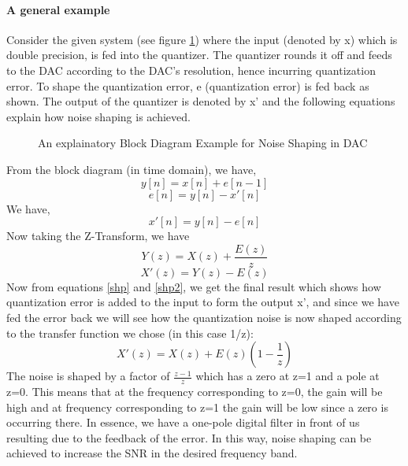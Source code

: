 \documentclass[colorlinks=true,pdfstartview=FitV,linkcolor=blue,
            citecolor=red,urlcolor=magenta]{ligodoc}
\begin{document}
    \paragraph{A general example}Consider the given system (see figure \ref{nshp}) where the input (denoted by x) which is double precision, is fed into the quantizer. The quantizer rounds it off and feeds to the DAC according to the DAC's resolution, hence incurring quantization error. To shape the quantization error, e (quantization error) is fed back as shown. The output of the quantizer is denoted by x' and the following equations explain how noise shaping is achieved.
	\begin{figure}[htbp]

  		\centering
  		
  		\caption{An explainatory Block Diagram Example for Noise Shaping in DAC}
		\label{nshp}
	\end{figure}
From the block diagram (in time domain), we have,
	\begin{equation}
		y[n]=x[n]+e[n-1]
	\end{equation}
	\begin{equation}
		e[n]=y[n]-x'[n]
	\end{equation}
We have,
	\begin{equation}
		x'[n]=y[n]-e[n]
	\end{equation}
Now taking the Z-Transform, we have
\begin{equation}
Y(z)=X(z)+\frac{E(z)}{z}
\label{shp}
\end{equation}
\begin{equation}
X'(z)=Y(z)-E(z)
\label{shp2}
\end{equation}
Now from equations \ref{shp} and \ref{shp2}, we get the final result which shows how quantization error is added to the input to form the output x', and since we have fed the error back we will see how the quantization noise is now shaped according to the transfer function we chose (in this case 1/z):
\begin{equation}
X'(z)=X(z)+E(z)(1-\frac{1}{z})
\end{equation}
The noise is shaped by a factor of $\frac{z-1}{z}$ which has a zero at z=1 and a pole at z=0. This means that at the frequency corresponding to z=0, the gain will be high and at frequency corresponding to z=1 the gain will be low since a zero is occurring there. In essence, we have a one-pole digital filter in front of us resulting due to the feedback of the error. In this way, noise shaping can be achieved to increase the SNR in the desired frequency band.
\end{document}
